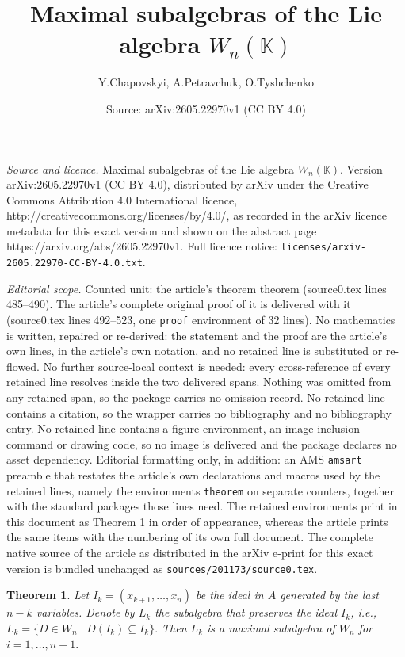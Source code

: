 \documentclass[10pt,a4paper]{amsart}
\title{Maximal subalgebras of the Lie algebra $W_n(\mathbb{K})$}
\author{Y.Chapovskyi, A.Petravchuk, O.Tyshchenko}
\date{Source: arXiv:2605.22970v1 (CC BY 4.0)}
\newtheorem{theorem}{Theorem}
\begin{document}
\maketitle

\noindent\emph{Source and licence.} Maximal subalgebras of the Lie algebra $W_n(\mathbb{K})$. Version arXiv:2605.22970v1 (CC BY 4.0), distributed by arXiv under the Creative Commons Attribution 4.0 International licence, http://creativecommons.org/licenses/by/4.0/, as recorded in the arXiv licence metadata for this exact version and shown on the abstract page https://arxiv.org/abs/2605.22970v1. Full licence notice: \texttt{licenses/arxiv-2605.22970-CC-BY-4.0.txt}.\par\smallskip

\noindent\textit{Editorial scope.} Counted unit: the article's theorem theorem (source0.tex lines 485--490). The article's complete original proof of it is delivered with it (source0.tex lines 492--523, one \texttt{proof} environment of 32 lines). No mathematics is written, repaired or re-derived: the statement and the proof are the article's own lines, in the article's own notation, and no retained line is substituted or re-flowed.  No further source-local context is needed: every cross-reference of every retained line resolves inside the two delivered spans.  Nothing was omitted from any retained span, so the package carries no omission record.  No retained line contains a citation, so the wrapper carries no bibliography and no bibliography entry.  No retained line contains a figure environment, an image-inclusion command or drawing code, so no image is delivered and the package declares no asset dependency.  Editorial formatting only, in addition: an AMS \texttt{amsart} preamble that restates the article's own declarations and macros used by the retained lines, namely the environments \texttt{theorem} on separate counters, together with the standard packages those lines need.  The retained environments print in this document as Theorem 1 in order of appearance, whereas the article prints the same items with the numbering of its own full document.  The complete native source of the article as distributed in the arXiv e-print for this exact version is bundled unchanged as \texttt{sources/201173/source0.tex}.
	\begin{theorem}
		Let $I_k = (x_{k+1}, \dots, x_n)$ be the ideal in $A$ generated by the last $n-k$ variables. Denote by $L_k$ the subalgebra that preserves the ideal $I_k$, i.e., 
		$L_k = \{ D \in W_n \mid D(I_k) \subseteq I_k \}.$
		Then $L_k$ is a maximal subalgebra of $W_n$ for $i=1, \ldots , n-1.$ 
		
	\end{theorem}
\end{document}
